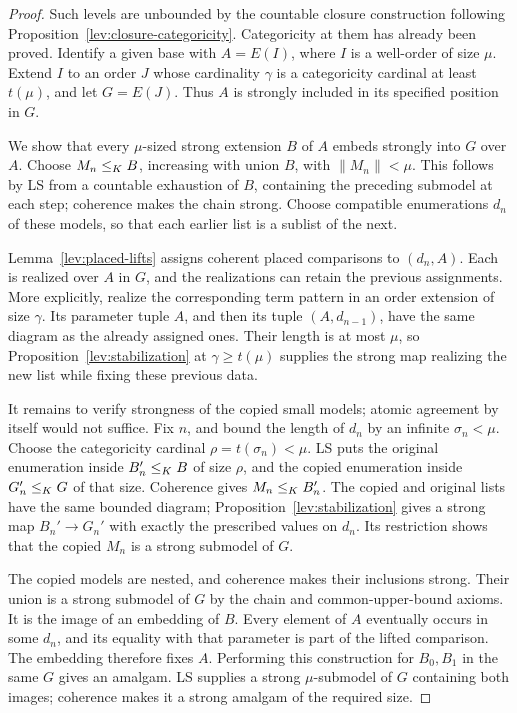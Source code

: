 \begin{proof}
Such levels are unbounded by the countable closure construction
following Proposition~\ref{lev:closure-categoricity}.
Categoricity at them has already been proved. Identify a
given base with \(A=E(I)\), where \(I\) is a well-order of
size \(\mu\). Extend \(I\) to an order \(J\) whose cardinality
\(\gamma\) is a categoricity cardinal at least \(t(\mu)\),
and let \(G=E(J)\). Thus \(A\) is strongly included in its
specified position in \(G\).

We show that every \(\mu\)-sized strong extension \(B\) of
\(A\) embeds strongly into \(G\) over \(A\). Choose
\(M_n\le_K B\), increasing with union \(B\), with
\(\|M_n\|<\mu\). This follows by LS from a countable
exhaustion of \(B\), containing the preceding submodel at
each step; coherence makes the chain strong. Choose compatible
enumerations \(d_n\) of these models, so that each earlier
list is a sublist of the next.

Lemma~\ref{lev:placed-lifts} assigns coherent placed comparisons
to \((d_n,A)\). Each is realized over \(A\) in \(G\), and
the realizations can retain the previous assignments. More
explicitly, realize the corresponding term pattern in an
order extension of size \(\gamma\). Its parameter tuple
\(A\), and then its tuple \((A,d_{n-1})\), have the same
diagram as the already assigned ones. Their length is at
most \(\mu\), so Proposition~\ref{lev:stabilization} at
\(\gamma\ge t(\mu)\) supplies the strong map realizing the
new list while fixing these previous data.

It remains to verify strongness of the copied small models;
atomic agreement by itself would not suffice. Fix \(n\),
and bound the length of \(d_n\) by an infinite
\(\sigma_n<\mu\). Choose the categoricity cardinal
\(\rho=t(\sigma_n)<\mu\). LS puts the original enumeration
inside \(B_n'\le_K B\) of size \(\rho\), and the copied
enumeration inside \(G_n'\le_K G\) of that size. Coherence
gives \(M_n\le_K B_n'\). The copied and original lists
have the same bounded diagram; Proposition~\ref{lev:stabilization}
gives a strong map \(B_n'\to G_n'\) with exactly the prescribed
values on \(d_n\). Its restriction shows that the copied
\(M_n\) is a strong submodel of \(G\).

The copied models are nested, and coherence makes their
inclusions strong. Their union is a strong submodel of \(G\)
by the chain and common-upper-bound axioms. It is the image
of an embedding of \(B\). Every element of \(A\) eventually
occurs in some \(d_n\), and its equality with that parameter
is part of the lifted comparison. The embedding therefore
fixes \(A\). Performing this construction for \(B_0,B_1\)
in the same \(G\) gives an amalgam. LS supplies a strong
\(\mu\)-submodel of \(G\) containing both images; coherence
makes it a strong amalgam of the required size.


\end{proof}
